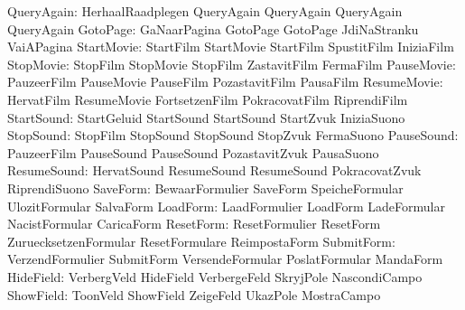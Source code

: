                QueryAgain: HerhaalRaadplegen         QueryAgain
                           QueryAgain                QueryAgain
                           QueryAgain                %
                 GotoPage: GaNaarPagina              GotoPage
                           GotoPage                  JdiNaStranku
                           VaiAPagina                %
               StartMovie: StartFilm                 StartMovie
                           StartFilm                 SpustitFilm
                           IniziaFilm
                StopMovie: StopFilm                  StopMovie
                           StopFilm                  ZastavitFilm
                           FermaFilm
               PauseMovie: PauzeerFilm               PauseMovie
                           PauseFilm                 PozastavitFilm
                           PausaFilm
              ResumeMovie: HervatFilm                ResumeMovie
                           FortsetzenFilm            PokracovatFilm
                           RiprendiFilm
               StartSound: StartGeluid               StartSound
                           StartSound                StartZvuk
                           IniziaSuono               %
                StopSound: StopFilm                  StopSound
                           StopSound                 StopZvuk
                           FermaSuono                %
               PauseSound: PauzeerFilm               PauseSound
                           PauseSound                PozastavitZvuk  
                           PausaSuono                %
              ResumeSound: HervatSound               ResumeSound
                           ResumeSound               PokracovatZvuk
                           RiprendiSuono             %
                 SaveForm: BewaarFormulier           SaveForm
                           SpeicheFormular           UlozitFormular
                           SalvaForm
                 LoadForm: LaadFormulier             LoadForm
                           LadeFormular              NacistFormular
                           CaricaForm
                ResetForm: ResetFormulier            ResetForm
                           ZuruecksetzenFormular     ResetFormulare
                           ReimpostaForm
               SubmitForm: VerzendFormulier          SubmitForm
                           VersendeFormular          PoslatFormular
                           MandaForm
                HideField: VerbergVeld               HideField
                           VerbergeFeld              SkryjPole
                           NascondiCampo
                ShowField: ToonVeld                  ShowField
                           ZeigeFeld                 UkazPole
                           MostraCampo

